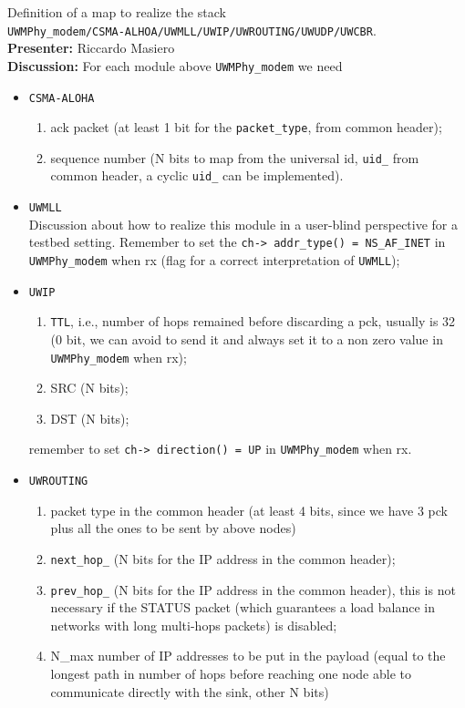 \documentclass[11pt,journal,draftclsnofoot,onecolumn,twoside,letterpaper]{IEEEtran}
\theoremstyle{definition} \newtheorem{definition}[]{Definition}
\theoremstyle{theorem} \newtheorem{theorem}[]{Theorem}
\begin{document}
 Definition of a map to realize the stack\\ {\tt UWMPhy\_modem/CSMA-ALHOA/UWMLL/UWIP/UWROUTING/UWUDP/UWCBR}.\\
{\bf Presenter:} Riccardo Masiero\\
{\bf Discussion:} 
For each module above {\tt UWMPhy\_modem} we need
\begin{itemize}
 \item {\tt CSMA-ALOHA}
 \begin{enumerate}
  \item ack packet (at least 1 bit for the {\tt packet\_type}, from common header);
  \item sequence number  (N bits to map from the universal id, {\tt uid\_} from common header, a cyclic {\tt uid\_} can be implemented). 
 \end{enumerate}
 \item {\tt UWMLL} \\
  Discussion about how to realize this module in a user-blind perspective for a testbed setting.
  Remember to set the {\tt ch-> addr\_type() = NS\_AF\_INET} in {\tt UWMPhy\_modem} when rx (flag for a correct interpretation of {\tt UWMLL}); 
 \item {\tt UWIP}
 \begin{enumerate}
  \item {\tt TTL}, i.e., number of hops remained before discarding a pck, usually is 32 (0 bit, we can avoid to send it and always set it to a non zero value in {\tt UWMPhy\_modem} when rx);
  \item SRC  (N bits);
  \item DST (N bits);
 \end{enumerate}
 remember to set {\tt ch-> direction() = UP} in {\tt UWMPhy\_modem} when rx.
 \item {\tt UWROUTING}\\
 \begin{enumerate}
  \item packet type in the common header (at least 4 bits, since we have 3 pck plus all the ones to be sent by above nodes)
  \item {\tt next\_hop\_} (N bits for the IP address in the common header);
  \item {\tt prev\_hop\_} (N bits for the IP address in the common header), this is not necessary if the STATUS packet (which guarantees a load balance in networks with long multi-hops packets) is disabled;
  \item N\_max number of IP addresses to be put in the payload (equal to the longest path in number of hops before reaching one node able to communicate directly with the sink, other N bits)

\end{enumerate}
\end{itemize}
\end{document}
